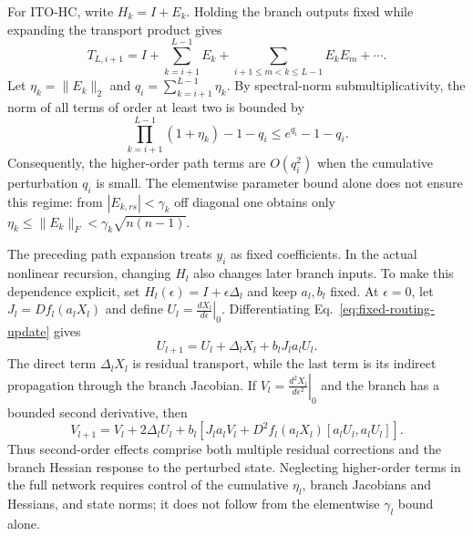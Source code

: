 \documentclass{article}
\begin{document}
For ITO-HC, write $H_k=I+E_k$.  Holding the branch outputs fixed while
expanding the transport product gives
\begin{equation}
 T_{L,i+1}=I+\sum_{k=i+1}^{L-1}E_k
 +\sum_{i+1\leq m<k\leq L-1}E_kE_m+\cdots.
 \label{eq:fixed-routing-path-series}
\end{equation}
Let $\eta_k=\lVert E_k\rVert_2$ and
$q_i=\sum_{k=i+1}^{L-1}\eta_k$.  By spectral-norm submultiplicativity,
the norm of all terms of order at least two is bounded by
\begin{equation}
 \prod_{k=i+1}^{L-1}(1+\eta_k)-1-q_i
 \leq e^{q_i}-1-q_i.
 \label{eq:fixed-routing-high-order-bound}
\end{equation}
Consequently, the higher-order path terms are $O(q_i^2)$ when the cumulative
perturbation $q_i$ is small.  The elementwise parameter bound alone does not
ensure this regime: from $|E_{k,rs}|<\gamma_k$ off diagonal one obtains only
 $\eta_k\leq\lVert E_k\rVert_F<\gamma_k\sqrt{n(n-1)}$.

The preceding path expansion treats $y_i$ as fixed coefficients.  In the
actual nonlinear recursion, changing $H_l$ also changes later branch inputs.
To make this dependence explicit, set $H_l(\epsilon)=I+\epsilon\Delta_l$
and keep $a_l,b_l$ fixed.  At $\epsilon=0$, let
$J_l=Df_l(a_lX_l)$ and define
$U_l=\left.\frac{dX_l}{d\epsilon}\right|_{0}$.  Differentiating
Eq.~\ref{eq:fixed-routing-update} gives
\begin{equation}
 U_{l+1}=U_l+\Delta_lX_l+b_lJ_la_lU_l.
 \label{eq:fixed-routing-first-variation}
\end{equation}
The direct term $\Delta_lX_l$ is residual transport, while the last term is
its indirect propagation through the branch Jacobian.  If
$V_l=\left.\frac{d^2X_l}{d\epsilon^2}\right|_{0}$ and the branch has a
bounded second derivative, then
\begin{equation}
 V_{l+1}=V_l+2\Delta_lU_l+b_l\left[J_la_lV_l
 +D^2f_l(a_lX_l)[a_lU_l,a_lU_l]\right].
 \label{eq:fixed-routing-second-variation}
\end{equation}
Thus second-order effects comprise both multiple residual corrections and the
branch Hessian response to the perturbed state.  Neglecting higher-order terms
in the full network requires control of the cumulative $\eta_l$, branch
Jacobians and Hessians, and state norms; it does not follow from the
elementwise $\gamma_l$ bound alone.
\end{document}
